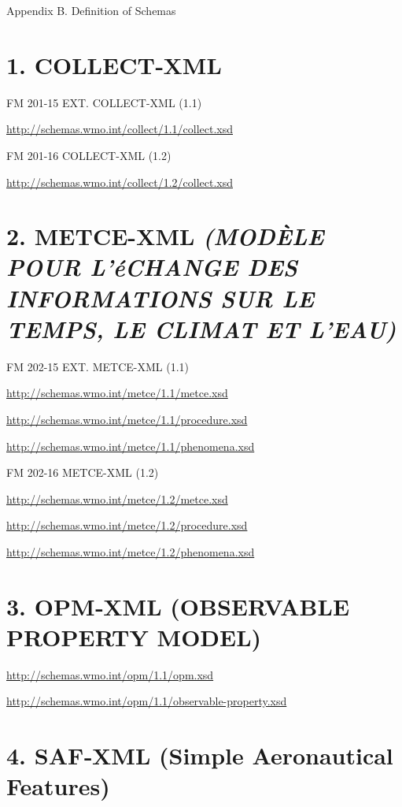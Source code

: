 Appendix B. Definition of Schemas

\hypertarget{collectxml}{%
\section{1. COLLECT‑XML}\label{collectxml}}

FM 201-15 EXT. COLLECT-XML (1.1)

\url{http://schemas.wmo.int/collect/1.1/collect.xsd}

FM 201-16 COLLECT-XML (1.2)

\url{http://schemas.wmo.int/collect/1.2/collect.xsd}

\hypertarget{metce-xml-moduxe8le-pour-luxe9change-des-informations-sur-le-temps-le-climat-et-leau}{%
\section{\texorpdfstring{2. METCE-XML \emph{\textbf{(MODÈLE POUR L'éCHANGE DES INFORMATIONS SUR LE TEMPS, LE CLIMAT ET L'EAU)}}}{2. METCE-XML (MODÈLE POUR L'éCHANGE DES INFORMATIONS SUR LE TEMPS, LE CLIMAT ET L'EAU)}}\label{metce-xml-moduxe8le-pour-luxe9change-des-informations-sur-le-temps-le-climat-et-leau}}

FM 202-15 EXT. METCE-XML (1.1)

\url{http://schemas.wmo.int/metce/1.1/metce.xsd}

\url{http://schemas.wmo.int/metce/1.1/procedure.xsd}

\url{http://schemas.wmo.int/metce/1.1/phenomena.xsd}

FM 202-16 METCE-XML (1.2)

\url{http://schemas.wmo.int/metce/1.2/metce.xsd}

\url{http://schemas.wmo.int/metce/1.2/procedure.xsd}

\url{http://schemas.wmo.int/metce/1.2/phenomena.xsd}

\hypertarget{opmxml-observable-property-model}{%
\section{3. OPM‑XML (OBSERVABLE PROPERTY MODEL)}\label{opmxml-observable-property-model}}

\url{http://schemas.wmo.int/opm/1.1/opm.xsd}

\url{http://schemas.wmo.int/opm/1.1/observable-property.xsd}

\hypertarget{safxml-simple-aeronautical-features}{%
\section{4. SAF‑XML (Simple Aeronautical Features)}\label{safxml-simple-aeronautical-features}}

